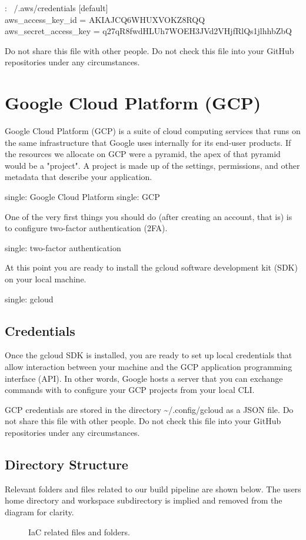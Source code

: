 \begin{mybox}{\thetcbcounter: ~/.aws/credentials}
  [default]\\
  aws\_access\_key\_id = AKIAJCQ6WHUXVOKZ8RQQ\\
  aws\_secret\_access\_key = q27qR8fwdHLUh7WOEH3JVd2VHjfRlQs1jlhhbZbQ\\
\end{mybox}

\justify
Do not share this file with other people. Do not check this file into
your GitHub repositories under any circumstances.

\section{Google Cloud Platform (GCP)}

\justify
Google Cloud Platform (GCP) is a suite of cloud computing services that
runs on the same infrastructure that Google uses internally for its
end-user products. If the
resources we allocate on GCP were a pyramid, the apex of that pyramid
would be a "project". A project is made up of the settings, permissions,
and other metadata that describe your application.

single: Google Cloud Platform single: GCP

\justify
One of the very first things you should do (after creating an account,
that is) is to configure two-factor authentication (2FA).

single: two-factor authentication

\justify
At this point you are ready to install the gcloud software development
kit (SDK) on your local machine.

single: gcloud

\subsection{Credentials}

\justify
Once the gcloud SDK is installed, you are ready to set up local
credentials that allow interaction between your machine and the GCP
application programming interface (API). In other words, Google hosts a
server that you can exchange commands with to configure your GCP
projects from your local CLI.

\justify
GCP credentials are stored in the directory
\textasciitilde{}/.config/gcloud as a JSON file. Do not share this file
with other people. Do not check this file into your GitHub repositories
under any circumstances.

\clearpage
\subsection{Directory Structure}

\justify
Relevant folders and files related to our build pipeline are shown
below. The users home directory and workspace subdirectory is implied
and removed from the diagram for clarity.

\begin{figure}[!htb]
  
  \caption{IaC related files and folders.}
\end{figure}
